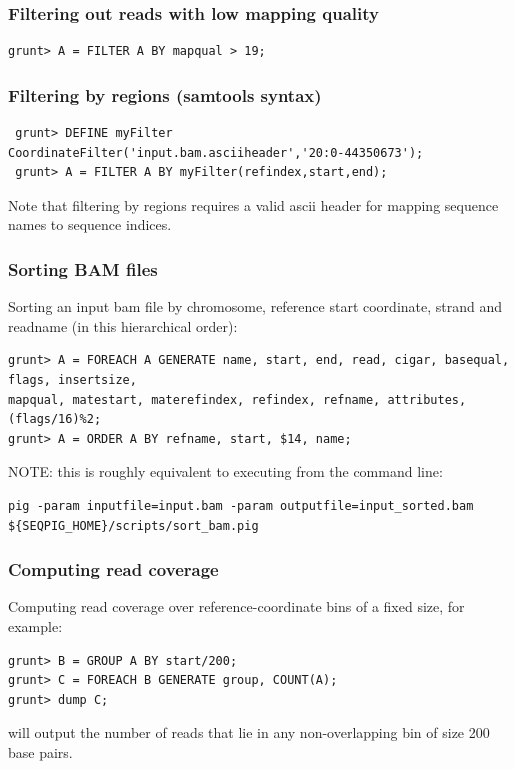 \subsubsection{Filtering out reads with low mapping quality}
\begin{lstlisting}
grunt> A = FILTER A BY mapqual > 19;
\end{lstlisting}
 \subsubsection{Filtering by regions (samtools syntax)}
\begin{lstlisting}
 grunt> DEFINE myFilter CoordinateFilter('input.bam.asciiheader','20:0-44350673');
 grunt> A = FILTER A BY myFilter(refindex,start,end);
\end{lstlisting}
Note that filtering by regions requires a valid ascii header for mapping
sequence names to sequence indices.

 \subsubsection{Sorting BAM files}
Sorting an input bam file by chromosome, reference start coordinate, strand
and readname (in this hierarchical order):
\begin{lstlisting}
grunt> A = FOREACH A GENERATE name, start, end, read, cigar, basequal, flags, insertsize,
mapqual, matestart, materefindex, refindex, refname, attributes, (flags/16)%2;
grunt> A = ORDER A BY refname, start, $14, name;
\end{lstlisting}
NOTE: this is roughly equivalent to executing from the command line:
\begin{lstlisting}
pig -param inputfile=input.bam -param outputfile=input_sorted.bam ${SEQPIG_HOME}/scripts/sort_bam.pig
\end{lstlisting}

 \subsubsection{Computing read coverage}
Computing read coverage over reference-coordinate bins of a fixed size,
for example:
\begin{lstlisting}
grunt> B = GROUP A BY start/200;
grunt> C = FOREACH B GENERATE group, COUNT(A);
grunt> dump C; 
\end{lstlisting}
will output the number of reads that lie in any non-overlapping bin of size 200 base pairs.

